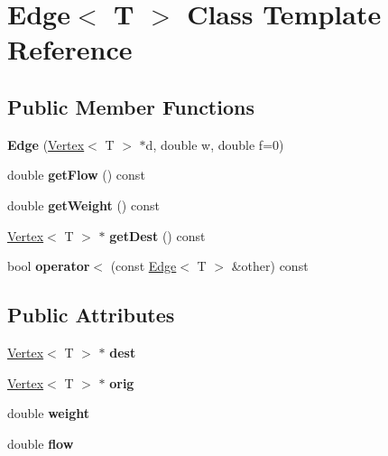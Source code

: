 \hypertarget{classEdge}{\section{Edge$<$ T $>$ Class Template Reference}
\label{classEdge}
}
\subsection*{Public Member Functions}
\begin{DoxyCompactItemize}
\item 
\hypertarget{classEdge_a9e1bb0df9fbcf5471a745d55b21d7d60}{{\bfseries Edge} (\hyperlink{classVertex}{Vertex}$<$ T $>$ $\ast$d, double w, double f=0)}\label{classEdge_a9e1bb0df9fbcf5471a745d55b21d7d60}

\item 
\hypertarget{classEdge_ac825bb839c49eac8b9c0c56cbd8ff31d}{double {\bfseries get\-Flow} () const }\label{classEdge_ac825bb839c49eac8b9c0c56cbd8ff31d}

\item 
\hypertarget{classEdge_a78f814ec429f84cd7336402326ad4ea8}{double {\bfseries get\-Weight} () const }\label{classEdge_a78f814ec429f84cd7336402326ad4ea8}

\item 
\hypertarget{classEdge_a3805fa2e04f1e7f0495fbba6524ea823}{\hyperlink{classVertex}{Vertex}$<$ T $>$ $\ast$ {\bfseries get\-Dest} () const }\label{classEdge_a3805fa2e04f1e7f0495fbba6524ea823}

\item 
\hypertarget{classEdge_a508b08c169f786a48652dc818fb442cd}{bool {\bfseries operator$<$} (const \hyperlink{classEdge}{Edge}$<$ T $>$ \&other) const }\label{classEdge_a508b08c169f786a48652dc818fb442cd}

\end{DoxyCompactItemize}
\subsection*{Public Attributes}
\begin{DoxyCompactItemize}
\item 
\hypertarget{classEdge_ae4d65678b91bd9d814af4720ad87cd0c}{\hyperlink{classVertex}{Vertex}$<$ T $>$ $\ast$ {\bfseries dest}}\label{classEdge_ae4d65678b91bd9d814af4720ad87cd0c}

\item 
\hypertarget{classEdge_a4510c31e0479f9d25f6e35d086887192}{\hyperlink{classVertex}{Vertex}$<$ T $>$ $\ast$ {\bfseries orig}}\label{classEdge_a4510c31e0479f9d25f6e35d086887192}

\item 
\hypertarget{classEdge_af188b57b604f0d65e2da48733bd76426}{double {\bfseries weight}}\label{classEdge_af188b57b604f0d65e2da48733bd76426}

\item 
\hypertarget{classEdge_a30808601fa37f509147eabf9cc5f9ed6}{double {\bfseries flow}}\label{classEdge_a30808601fa37f509147eabf9cc5f9ed6}

\end{DoxyCompactItemize}
